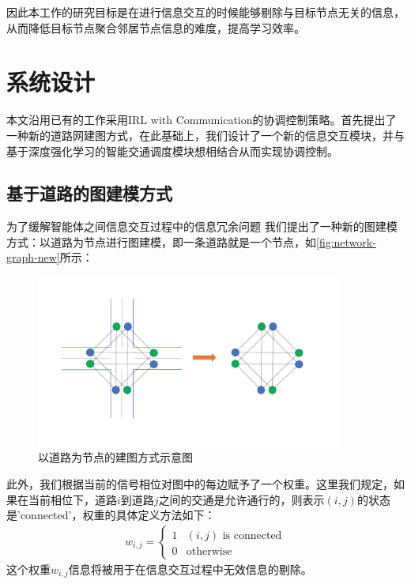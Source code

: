 因此本工作的研究目标是在进行信息交互的时候能够剔除与目标节点无关的信息，从而降低目标节点聚合邻居节点信息的难度，提高学习效率。

\section{系统设计}
本文沿用已有的工作\cite{wei2019colight}采用IRL with Communication的协调控制策略。首先提出了一种新的道路网建图方式，在此基础上，我们设计了一个新的信息交互模块，并与基于深度强化学习的智能交通调度模块想相结合从而实现协调控制。

\subsection{基于道路的图建模方式}
为了缓解智能体之间信息交互过程中的信息冗余问题 我们提出了一种新的图建模方式：以道路为节点进行图建模，即一条道路就是一个节点，如\autoref{fig:network-graph-new}所示：
\begin{figure}[htb]
  \includegraphics[width=0.9\textwidth]{ppt/graph-modeling.pdf}
  \caption{以道路为节点的建图方式示意图}
  \label{fig:network-graph-new}
\end{figure}

此外，我们根据当前的信号相位对图中的每边赋予了一个权重。这里我们规定，如果在当前相位下，道路$i$到道路$j$之间的交通是允许通行的，则表示$(i,j)$的状态是'connected'，权重的具体定义方法如下：
\begin{align}
  w_{i,j} = \begin{cases}
    1 & (i, j) \text{ is connected} \\
    0 & \text{otherwise}
  \end{cases}
\end{align}
这个权重$w_{i,j}$信息将被用于在信息交互过程中无效信息的剔除。

